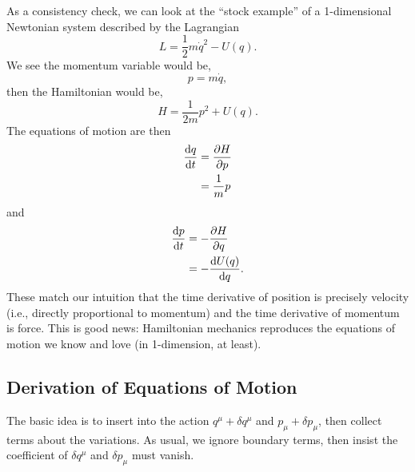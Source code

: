 \M
As a consistency check, we can look at the ``stock example'' of a
1-dimensional Newtonian system described by the Lagrangian
\begin{equation}
L = \frac{1}{2}m\dot{q}^{2} - U(q).
\end{equation}
We see the momentum variable would be,
\begin{equation}
p = m\dot{q},
\end{equation}
then the Hamiltonian would be,
\begin{equation}
H = \frac{1}{2m}p^{2} + U(q).
\end{equation}
The equations of motion are then
\begin{subequations}
\begin{align}
\frac{\mathrm{d} q}{\mathrm{d} t} &= \frac{\partial H}{\partial p}\\
&= \frac{1}{m}p
\end{align}
\end{subequations}
and
\begin{subequations}
\begin{align}
\frac{\mathrm{d} p}{\mathrm{d} t} &= -\frac{\partial H}{\partial q}\\
&= -\frac{\mathrm{d} U(q)}{\mathrm{d} q}.
\end{align}
\end{subequations}
These match our intuition that the time derivative of position is
precisely velocity (i.e., directly proportional to momentum) and the
time derivative of momentum is force. This is good news: Hamiltonian
mechanics reproduces the equations of motion we know and love (in
1-dimension, at least).

\subsection{Derivation of Equations of Motion}

\M
The basic idea is to insert into the action $q^{\mu} + \delta q^{\mu}$
and $p_{\mu} + \delta p_{\mu}$, then collect terms about the variations.
As usual, we ignore boundary terms, then insist the coefficient of
$\delta q^{\mu}$ and $\delta p_{\mu}$ must vanish.

